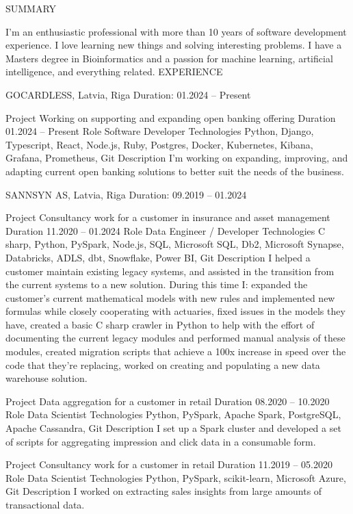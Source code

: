 \documentclass[12pt]{article}
\begin{document}
SUMMARY

I'm an enthusiastic professional with more than 10 years of software development experience. I love learning new things and solving interesting problems. I have a Masters degree in Bioinformatics and a passion for machine learning, artificial intelligence, and everything related.
EXPERIENCE

GOCARDLESS, Latvia, Riga
Duration: 01.2024 – Present

Project
Working on supporting and expanding open banking offering
Duration
01.2024 – Present
Role
Software Developer
Technologies
Python, Django, Typescript, React, Node.js, Ruby, Postgres, Docker, Kubernetes, Kibana, Grafana, Prometheus, Git
Description
I’m working on expanding, improving, and adapting current open banking solutions to better suit the needs of the business.

SANNSYN AS, Latvia, Riga
Duration: 09.2019 – 01.2024

Project
Consultancy work for a customer in insurance and asset management
Duration
11.2020 – 01.2024
Role
Data Engineer / Developer
Technologies
C sharp, Python, PySpark, Node.js, SQL, Microsoft SQL, Db2, Microsoft Synapse, Databricks, ADLS, dbt, Snowflake, Power BI, Git
Description
I helped a customer maintain existing legacy systems, and assisted in the transition from the current systems to a new solution. During this time I:
expanded the customer's current mathematical models with new rules and implemented new formulas while closely cooperating with actuaries,
fixed issues in the models they have,
created a basic C sharp crawler in Python to help with the effort of documenting the current legacy modules and performed manual analysis of these modules,
created migration scripts that achieve a 100x increase in speed over the code that they're replacing,
worked on creating and populating a new data warehouse solution.

Project
Data aggregation for a customer in retail
Duration
08.2020 – 10.2020
Role
Data Scientist
Technologies
Python, PySpark, Apache Spark, PostgreSQL, Apache Cassandra, Git
Description
I set up a Spark cluster and developed a set of scripts for aggregating impression and click data in a consumable form.

Project
Consultancy work for a customer in retail
Duration
11.2019 – 05.2020
Role
Data Scientist
Technologies
Python, PySpark, scikit-learn, Microsoft Azure, Git
Description
I worked on extracting sales insights from large amounts of transactional data.
\end{document}
